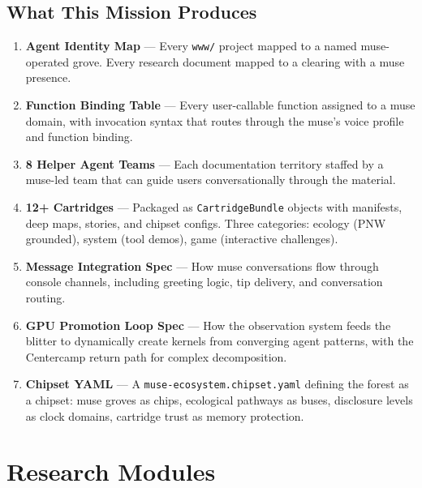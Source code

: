 \documentclass[11pt,letterpaper]{article}
\newcommand{\stageheader}[2]{%
  \noindent\colorbox{#2}{\makebox[\textwidth][l]{%
    \textcolor{white}{\bfseries\sffamily\hspace{6pt}#1\hspace{6pt}}}}%
  \vspace{0.5em}\par%
}
\begin{document}
\subsection{What This Mission Produces}

\begin{enumerate}[leftmargin=2em]
\item \textbf{Agent Identity Map} --- Every \texttt{www/} project mapped to a named muse-operated grove. Every research document mapped to a clearing with a muse presence.

\item \textbf{Function Binding Table} --- Every user-callable function assigned to a muse domain, with invocation syntax that routes through the muse's voice profile and function binding.

\item \textbf{8 Helper Agent Teams} --- Each documentation territory staffed by a muse-led team that can guide users conversationally through the material.

\item \textbf{12+ Cartridges} --- Packaged as \texttt{CartridgeBundle} objects with manifests, deep maps, stories, and chipset configs. Three categories: ecology (PNW grounded), system (tool demos), game (interactive challenges).

\item \textbf{Message Integration Spec} --- How muse conversations flow through console channels, including greeting logic, tip delivery, and conversation routing.

\item \textbf{GPU Promotion Loop Spec} --- How the observation system feeds the blitter to dynamically create kernels from converging agent patterns, with the Centercamp return path for complex decomposition.

\item \textbf{Chipset YAML} --- A \texttt{muse-ecosystem.chipset.yaml} defining the forest as a chipset: muse groves as chips, ecological pathways as buses, disclosure levels as clock domains, cartridge trust as memory protection.
\end{enumerate}

\newpage

\stageheader{STAGE 2 --- RESEARCH PLAN}{secondary}

\section{Research Modules}
\end{document}
